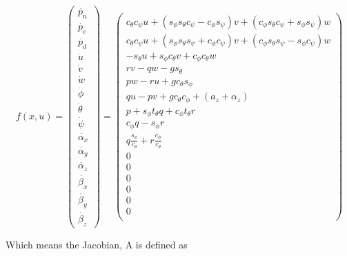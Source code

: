 \documentclass{article}
\newcommand{\cp}{c_{\phi}}
\newcommand{\ct}{c_{\theta}}
\newcommand{\cs}{c_{\psi}}
\newcommand{\sip}{s_{\phi}}
\newcommand{\sit}{s_{\theta}}
\newcommand{\sis}{s_{\psi}}
\newcommand{\tant}{t_{\theta}}
\begin{document}
\begin{equation}
	f(x,u) = \begin{pmatrix}
						\dot{p_n} \\ \dot{p_e} \\ \dot{p_d} \\ \dot{u} \\ \dot{v} \\ \dot{w} \\ \dot{\phi} \\ \dot{\theta} \\ \dot{\psi} \\ \dot{\alpha_x} \\ \dot{\alpha_y} \\ \dot{\alpha_z} \\ \dot{\beta_x} \\ \dot{\beta_y} \\ \dot{\beta_z} \end{pmatrix} =
					\begin{pmatrix}
					\ct\cs u + \left(\sip\sit\cs-\cp\sis\right) v + \left(\cp\sit\cs+\sip\sis\right)w \\
					\ct\cs u + \left(\sip\sit\sis+\cp\cs\right) v + \left(\cp\sit\sis-\sip\cs\right)w \\
					-\sit  u + \sip\ct v                          +\cp\ct w          \\
					rv-qw - g\sit \\
					pw-ru + g\ct\sip \\
					qu-pv + g\ct\cp + (a_z + \alpha_z) \\
					p + \sip\tant q + \cp\tant r \\
					\cp q - \sip r \\
					q \tfrac{\sip}{\ct} + r \tfrac{\cp}{\ct} \\
					0 \\ 0 \\ 0 \\ 0 \\ 0 \\ 0 \\
					\end{pmatrix}
\end{equation}

Which means the Jacobian, A is defined as 
\end{document}
